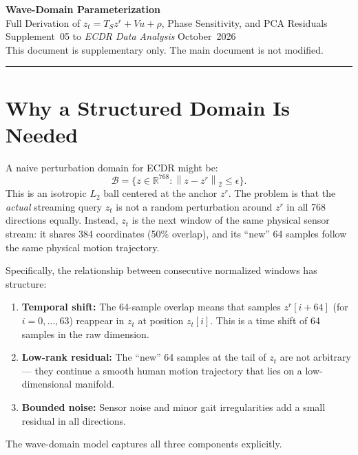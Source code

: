 \documentclass[11pt, a4paper]{article}
\theoremstyle{definition}
\theoremstyle{plain}
\newcommand{\R}{\mathbb{R}}
\newcommand{\norm}[2]{\left\|#1\right\|_{#2}}
\begin{document}
\begin{center}
  {\LARGE\bfseries\color{teal} Wave-Domain Parameterization}\\[0.5em]
  {\large\color{muted} Full Derivation of $z_t = T_S z^r + Vu + \rho$, Phase Sensitivity, and PCA Residuals}\\[1.2em]
  {\normalsize Supplement~05 to \textit{ECDR Data Analysis} \textbar{} October~2026}\\[0.3em]
  {\small\color{muted} This document is supplementary only. The main document is not modified.}
\end{center}

\vspace{1em}\hrule\vspace{1em}

\tableofcontents
\clearpage

\section{Why a Structured Domain Is Needed}

A naive perturbation domain for ECDR might be:
\[
  \mathcal{B} = \bigl\{ z \in \R^{768} : \norm{z - z^r}{2} \le \epsilon \bigr\}.
\]
This is an isotropic $L_2$ ball centered at the anchor $z^r$. The problem is that
the \emph{actual} streaming query $z_t$ is not a random perturbation around $z^r$
in all 768 directions equally. Instead, $z_t$ is the next window of the same
physical sensor stream: it shares 384 coordinates (50\% overlap), and its
``new'' 64 samples follow the same physical motion trajectory.

Specifically, the relationship between consecutive normalized windows has structure:
\begin{enumerate}[leftmargin=1.5em]
  \item \textbf{Temporal shift:} The 64-sample overlap means that samples
        $z^r[i+64]$ (for $i = 0, \ldots, 63$) reappear in $z_t$ at position $z_t[i]$.
        This is a time shift of 64 samples in the raw dimension.
  \item \textbf{Low-rank residual:} The ``new'' 64 samples at the tail of $z_t$
        are not arbitrary — they continue a smooth human motion trajectory that
        lies on a low-dimensional manifold.
  \item \textbf{Bounded noise:} Sensor noise and minor gait irregularities add
        a small residual in all directions.
\end{enumerate}
The wave-domain model captures all three components explicitly.
\end{document}
